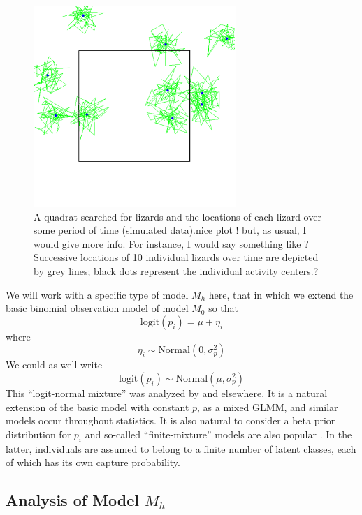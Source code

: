 \begin{figure}
\begin{center}
\includegraphics[height=3in]{Ch3/figs/quadrat}
\end{center}
\caption{A quadrat searched for lizards and the locations of each
  lizard over some period of time (simulated data).nice plot ! but, as usual, I would give more info. For instance, I would say something like ?Successive locations of 10 individual lizards over time are depicted by grey lines; black dots represent the individual activity centers.?}
\label{closed.fig.quadrat}
\end{figure}

We will work with a specific type of model $M_{h}$ here, that in which
we extend the basic binomial observation model of model $M_{0}$ so
that
\[
\mbox{logit}(p_{i}) = \mu + \eta_{i}
\]
where
\[
\eta_{i} \sim \mbox{Normal}(0, \sigma_{p}^2)
\]
We could as well write
\[
\mbox{logit}(p_{i}) \sim \mbox{Normal}(\mu,\sigma_{p}^2)
\]
This ``logit-normal mixture'' was analyzed by
\citet{coull_agresti:1999} and elsewhere. It is a natural extension of
the basic model with constant $p$, as a mixed GLMM, and similar models
occur throughout statistics. It is also natural to consider a beta
prior distribution for $p_{i}$ \citep{dorazio_royle:2003} and
so-called ``finite-mixture'' models 
are also popular
\citep{norris_pollock:1996, pledger:2000}. In the latter, individuals are assumed to 
belong to a finite number of latent classes, each of which has its own capture probability. 


\subsection{Analysis of Model $M_h$}

